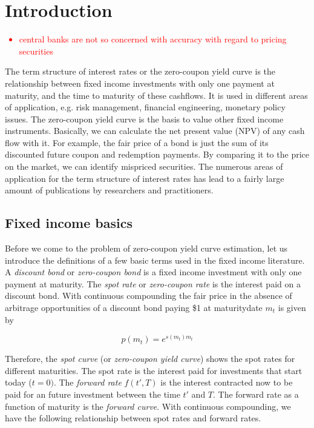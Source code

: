 \section{Introduction}

\textcolor{red}{
\begin{itemize}
\item central banks are not so concerned with accuracy with regard to pricing securities
\end{itemize}
}


The term structure of interest rates or the zero-coupon yield curve is the relationship between fixed income investments with only one payment at maturity, and the time to maturity of these cashflows. It is used in different areas of application, e.g. risk management, financial engineering, monetary policy issues. The zero-coupon yield curve is the basis to value other fixed income instruments. Basically, we can calculate the net present value (NPV) of any cash flow with it. For example, the fair price of a bond is just the sum of its discounted future coupon and redemption payments. By comparing it to the price on the market, we can identify mispriced securities. The numerous areas of application for the term structure of interest rates has lead to a fairly large amount of publications by researchers and practitioners.

\subsection{Fixed income basics}

Before we come to the problem of zero-coupon yield curve estimation, let us introduce the definitions of a few basic terms used in the fixed income literature. A \emph{discount bond} or \emph{zero-coupon bond} is a fixed income investment with only one payment at maturity. The \emph{spot rate} or \emph{zero-coupon rate} is the interest paid on a discount bond. With continuous compounding the fair price in the absence of arbitrage opportunities of a discount bond paying \$1 at maturitydate  $m_t$ is given by

\begin{equation}
  \label{eq:pricediscountbond}
  p(m_t)=e^{s(m_t)m_t}
\end{equation}

Therefore, the \emph{spot curve} (or \emph{zero-coupon yield curve}) shows the spot rates for different maturities. The spot rate is the interest paid for investments that start today ($t=0)$. The \emph{forward rate} $f(t',T)$ is the interest contracted now to be paid for an future investment between the time $t'$ and $T$. The forward rate as a function of maturity is the \emph{forward curve}. With continuous compounding, we have the following relationship between spot rates and forward rates.

